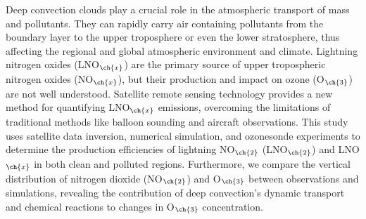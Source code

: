 {
Deep convection clouds play a crucial role in the atmospheric transport of mass and pollutants.
They can rapidly carry air containing pollutants from the boundary layer to the upper troposphere or even the lower stratosphere,
thus affecting the regional and global atmospheric environment and climate.
Lightning nitrogen oxides (LNO$_{\ch{x}}$) are the primary source of upper tropospheric nitrogen oxides (NO$_{\ch{x}}$),
but their production and impact on ozone (O$_{\ch{3}}$) are not well understood.
Satellite remote sensing technology provides a new method for quantifying LNO$_{\ch{x}}$ emissions, overcoming the limitations of traditional methods like balloon sounding and aircraft observations.
This study uses satellite data inversion, numerical simulation, and ozonesonde experiments to determine the production efficiencies of lightning NO$_{\ch{2}}$ (LNO$_{\ch{2}}$) and LNO$_{\ch{x}}$ in both clean and polluted regions.
Furthermore, we compare the vertical distribution of nitrogen dioxide (NO$_{\ch{2}}$) and O$_{\ch{3}}$ between observations and simulations, revealing the contribution of deep convection's dynamic transport and chemical reactions to changes in O$_{\ch{3}}$ concentration.

}
